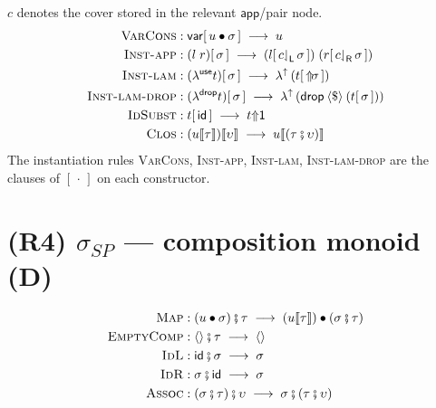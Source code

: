 \documentclass{article}
\newcommand{\oi}{\mathsf{1}}                        %
\newcommand{\wt}[2]{#1 {\Uparrow} #2}              %
\newcommand{\fmap}{\mathbin{\langle\$\rangle}}     %
\newcommand{\lamU}{\lambda^{{\uparrow}}}
\newcommand{\selL}{\mathord{{\downharpoonleft}_{\mathsf{L}}}}
\newcommand{\selR}{\mathord{{\downharpoonleft}_{\mathsf{R}}}}
\newcommand{\ids}{\mathsf{id}}
\newcommand{\nil}{\langle\rangle}                   %
\newcommand{\ins}[1]{[\,#1\,]}                      %
\newcommand{\app}[2]{#1\llbracket#2\rrbracket}      %
\newcommand{\seq}{\mathbin{{\fatsemi}}}             %
\newcommand{\cons}{\mathbin{\bullet}}               %
\newcommand{\Up}{\mathord{{\Uparrow}\!}}            %
\newcommand{\rw}{\;\longrightarrow\;}              %
\newcommand{\catD}{\textbf{(D)}}
\theoremstyle{plain}
\begin{document}
\noindent
$c$ denotes the cover stored in the relevant $\mathsf{app}$/pair node.
\begin{align}
  \textsc{VarCons} &: \mathsf{var}\ins{u\cons\sigma} \rw u \label{r:varcons}\\
  \textsc{Inst-app} &: (l\;r)\ins\sigma \rw (l\ins{c\selL\,\sigma})\;(r\ins{c\selR\,\sigma}) \label{r:instApp}\\
  \textsc{Inst-lam} &: (\lambda^{\mathsf{use}} t)\ins\sigma \rw \lamU\,(t\ins{\Up\sigma}) \label{r:instLam}\\
  \textsc{Inst-lam-drop} &: (\lambda^{\mathsf{drop}} t)\ins\sigma \rw \lamU\,(\mathsf{drop}\fmap(t\ins\sigma)) \label{r:instLamDrop}\\
  \textsc{IdSubst} &: t\ins\ids \rw \wt{t}{\oi} \label{r:idsubst}\\
  \textsc{Clos} &: \app{(\app{u}{\tau})}{\upsilon} \rw \app{u}{(\tau\seq\upsilon)} \label{r:clos}
\end{align}
The instantiation rules \textsc{VarCons}, \textsc{Inst-app}, \textsc{Inst-lam},
\textsc{Inst-lam-drop} are the clauses of $\ins\cdot$ on each constructor.

\section{(R4) $\sigma_{SP}$ --- composition monoid \hfill \catD}\label{r:monoid}
\begin{align}
  \textsc{Map} &: (u\cons\sigma)\seq\tau \rw (\app{u}{\tau})\cons(\sigma\seq\tau) \label{r:map}\\
  \textsc{EmptyComp} &: \nil\seq\tau \rw \nil \label{r:emptyComp}\\
  \textsc{IdL} &: \ids\seq\sigma \rw \sigma \label{r:idL}\\
  \textsc{IdR} &: \sigma\seq\ids \rw \sigma \label{r:idR}\\
  \textsc{Assoc} &: (\sigma\seq\tau)\seq\upsilon \rw \sigma\seq(\tau\seq\upsilon) \label{r:assoc}
\end{align}

\end{document}
